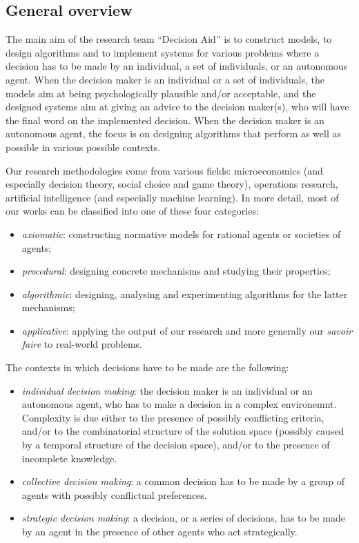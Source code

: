 \subsection{General overview}

The main aim of the  research team ``Decision Aid'' is to construct models, to design algorithms and to implement systems for various problems where a decision has to be made by an individual, a set of individuals, or an autonomous agent. When the decision maker is an individual or a set of individuals, the models aim at being psychologically plausible and/or acceptable, and the designed systems aim at giving an advice to the decision maker(s), who will have the final word on the implemented decision. When the decision maker is an autonomous agent, the focus is on designing algorithms that perform as well as possible in various possible contexts. 

Our research methodologies come from various fields: microeconomics (and especially decision theory, social choice and game theory), operations research, artificial intelligence (and especially machine learning). In more detail, most of our works can be classified into one of these four categories:
\begin{itemize}
\item {\em axiomatic}: constructing normative models for rational agents or societies of agents;
\item {\em procedural}: designing concrete mechanisms and studying their properties;
\item {\em algorithmic}: designing, analysing and experimenting algorithms for the latter mechanisms;
\item {\em applicative}: applying the output of our research and more generally our {\em savoir faire} to real-world problems.
\end{itemize}

The contexts in which decisions have to be made are the following:

\begin{itemize}
\item {\em individual decision making}: the decision maker is an individual or an autonomous agent, who has to make a decision in a complex environemnt. Complexity is due either to the presence of possibly conflicting criteria, and/or to the combinatorial structure of the solution space  (possibly caused by a temporal structure of the decision space), and/or to the presence of incomplete knowledge.
\item {\em collective decision making}: a common decision has to be made by a group of agents with possibly conflictual preferences.
\item {\em strategic decision making}: a decision, or a series of decisions, has to be made by an agent in the presence of other agents who act strategically.  
\end{itemize}

